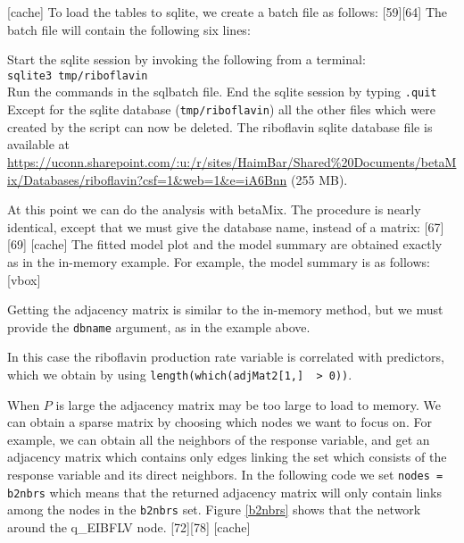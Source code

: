 \documentclass[a4paper,10pt]{article}
\let\code\texttt
\newcommand{\pkg}[1]{{\fontshape{it}\selectfont #1}}
\begin{document}
[cache]
To load the tables to sqlite, we create a batch file as follows:
[59][64]
The batch file will contain the following six lines:

Start the sqlite session by invoking the following from a terminal:\\
\verb|sqlite3 tmp/riboflavin|\\
Run the commands in the sqlbatch file. End the sqlite session by typing \code{.quit}\\
Except for the sqlite database (\verb|tmp/riboflavin|) all the other files which were created by the script can now be deleted.
The riboflavin sqlite database file is available at \url{https://uconn.sharepoint.com/:u:/r/sites/HaimBar/Shared\%20Documents/betaMix/Databases/riboflavin?csf=1&web=1&e=iA6Bnn} (255 MB).

At this point we can do the analysis with \pkg{betaMix}. The procedure is nearly identical, except that we must give the database name, instead of a matrix:
[67][69]
[cache]
The fitted model plot and the model summary are obtained exactly as in the in-memory example. For example, the model summary is as follows:
[vbox]

Getting the adjacency matrix is similar to the in-memory method, but we must provide the \code{dbname} argument, as in the example above. 

In this case the riboflavin production rate variable is correlated with  predictors, which we obtain by using \verb|length(which(adjMat2[1,]  > 0))|.

When $P$ is large the adjacency matrix may be too large to load to memory. We can obtain a sparse matrix by choosing which nodes we want to focus on. For example, we can obtain all the neighbors of the response variable, and get an adjacency matrix which contains only edges linking the set which consists of the response variable and its direct neighbors. In the following code we set \code{nodes = b2nbrs} which means that the returned adjacency matrix will only contain links among the nodes in the \code{b2nbrs} set. Figure \ref{b2nbrs} shows that the network around the q\_EIBFLV node.
[72][78]
[cache]
\end{document}
